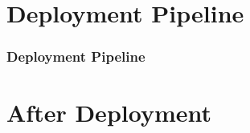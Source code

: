 \documentclass{beamer}
\begin{document}

\section{Deployment Pipeline}

\begin{frame}
	\frametitle{Deployment Pipeline}
	\framesubtitle{}

\end{frame}

\section{After Deployment}
\end{document}
